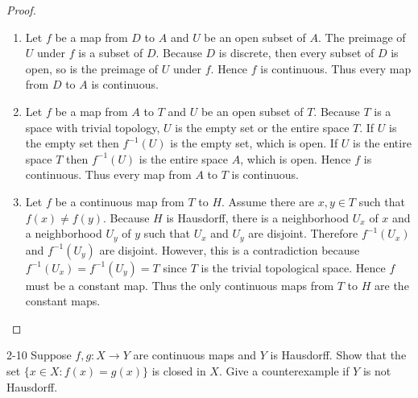 \begin{proof}
	\begin{enumerate}[label={(\alph*)}]
		\item Let $f$ be a map from $D$ to $A$ and $U$ be an open subset of $A$. The preimage of $U$ under $f$ is a subset of $D$. Because $D$ is discrete, then every subset of $D$ is open, so is the preimage of $U$ under $f$. Hence $f$ is continuous. Thus every map from $D$ to $A$ is continuous.
		\item Let $f$ be a map from $A$ to $T$ and $U$ be an open subset of $T$. Because $T$ is a space with trivial topology, $U$ is the empty set or the entire space $T$. If $U$ is the empty set then $f^{-1}(U)$ is the empty set, which is open. If $U$ is the entire space $T$ then $f^{-1}(U)$ is the entire space $A$, which is open. Hence $f$ is continuous. Thus every map from $A$ to $T$ is continuous.
		\item Let $f$ be a continuous map from $T$ to $H$. Assume there are $x, y\in T$ such that $f(x)\ne f(y)$. Because $H$ is Hausdorff, there is a neighborhood $U_{x}$ of $x$ and a neighborhood $U_{y}$ of $y$ such that $U_{x}$ and $U_{y}$ are disjoint. Therefore $f^{-1}(U_{x})$ and $f^{-1}(U_{y})$ are disjoint. However, this is a contradiction because $f^{-1}(U_{x}) = f^{-1}(U_{y}) = T$ since $T$ is the trivial topological space. Hence $f$ must be a constant map. Thus the only continuous maps from $T$ to $H$ are the constant maps.
	\end{enumerate}
\end{proof}

\begin{problem}{2-10}
Suppose $f, g: X\to Y$ are continuous maps and $Y$ is Hausdorff. Show that the set $\{ x\in X : f(x) = g(x) \}$ is closed in $X$. Give a counterexample if $Y$ is not Hausdorff.
\end{problem}


